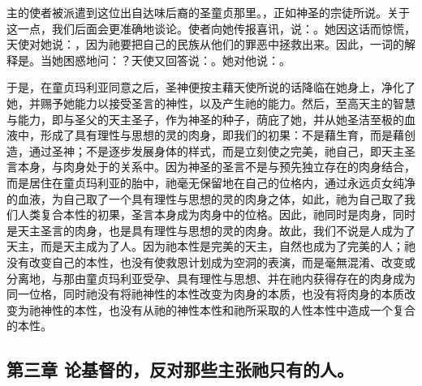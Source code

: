 主的使者被派遣到这位出自达味后裔的圣童贞那里。，正如神圣的宗徒所说。关于这一点，我们后面会更准确地谈论。使者向她传报喜讯，说：。她因这话而惊慌，天使对她说：，因为祂要把自己的民族从他们的罪恶中拯救出来。因此，一词的解释是。当她困惑地问：？天使又回答说：。她对他说：。\par

于是，在童贞玛利亚同意之后，圣神便按主藉天使所说的话降临在她身上，净化了她，并赐予她能力以接受圣言的神性，以及产生祂的能力。然后，至高天主的智慧与能力，即与圣父的天主圣子，作为神圣的种子，荫庇了她，并从她圣洁至极的血液中，形成了具有理性与思想的灵的肉身，即我们的初果：不是藉生育，而是藉创造，通过圣神；不是逐步发展身体的样式，而是立刻使之完美，祂自己，即天主圣言本身，与肉身处于的关系中。因为神圣的圣言不是与预先独立存在的肉身结合，而是居住在童贞玛利亚的胎中，祂毫无保留地在自己的位格内，通过永远贞女纯净的血液，为自己取了一个具有理性与思想的灵的肉身之体，如此，祂为自己取了我们人类复合本性的初果，圣言本身成为肉身中的位格。因此，祂同时是肉身，同时是天主圣言的肉身，也是具有理性与思想的灵的肉身。故此，我们不说是人成为了天主，而是天主成为了人。因为祂本性是完美的天主，自然也成为了完美的人；祂没有改变自己的本性，也没有使救恩计划成为空洞的表演，而是毫無混淆、改变或分离地，与那由童贞玛利亚受孕、具有理性与思想、并在祂内获得存在的肉身成为同一位格，同时祂没有将祂神性的本性改变为肉身的本质，也没有将肉身的本质改变为祂神性的本性，也没有从祂的神性本性和祂所采取的人性本性中造成一个复合的本性。\par


\subsection{第三章 论基督的，反对那些主张祂只有的人。}

